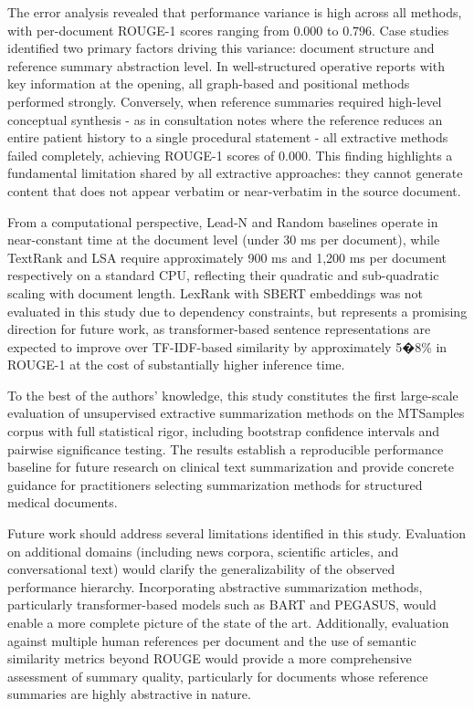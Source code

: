 \documentclass[12pt,twoside,en,win]{bmzhart}
\begin{document}
	The error analysis revealed that performance variance is high across all methods, with per-document ROUGE-1 scores 
	ranging from $0.000$ to $0.796$. Case studies identified two primary factors driving this variance: document structure 
	and reference summary abstraction level. In well-structured operative reports with key information at the opening, all 
	graph-based and positional methods performed strongly. Conversely, when reference summaries required high-level 
	conceptual synthesis - as in consultation notes where the reference reduces an entire patient history to a single 
	procedural statement - all extractive methods failed completely, achieving ROUGE-1 scores of $0.000$. This finding 
	highlights a fundamental limitation shared by all extractive approaches: they cannot generate content that does not 
	appear verbatim or near-verbatim in the source document.

	From a computational perspective, Lead-N and Random baselines operate in near-constant time at the document level 
	(under 30 ms per document), while TextRank and LSA require approximately 900 ms and 1,200 ms per document respectively 
	on a standard CPU, reflecting their quadratic and sub-quadratic scaling with document length. LexRank with SBERT 
	embeddings was not evaluated in this study due to dependency constraints, but represents a promising direction for 
	future work, as transformer-based sentence representations are expected to improve over TF-IDF-based similarity by 
	approximately 5�8\% in ROUGE-1 at the cost of substantially higher inference time.

	To the best of the authors' knowledge, this study constitutes the first large-scale evaluation of unsupervised 
	extractive summarization methods on the MTSamples corpus with full statistical rigor, including bootstrap confidence 
	intervals and pairwise significance testing. The results establish a reproducible performance baseline for future 
	research on clinical text summarization and provide concrete guidance for practitioners selecting summarization 
	methods for structured medical documents.

	Future work should address several limitations identified in this study. Evaluation on additional domains (including 
	news corpora, scientific articles, and conversational text) would clarify the generalizability of the observed 
	performance hierarchy. Incorporating abstractive summarization methods, particularly transformer-based models 
	such as BART and PEGASUS, would enable a more complete picture of the state of the art. Additionally, evaluation 
	against multiple human references per document and the use of semantic similarity metrics beyond ROUGE would 
	provide a more comprehensive assessment of summary quality, particularly for documents whose reference summaries 
	are highly abstractive in nature.
	
\end{document}
